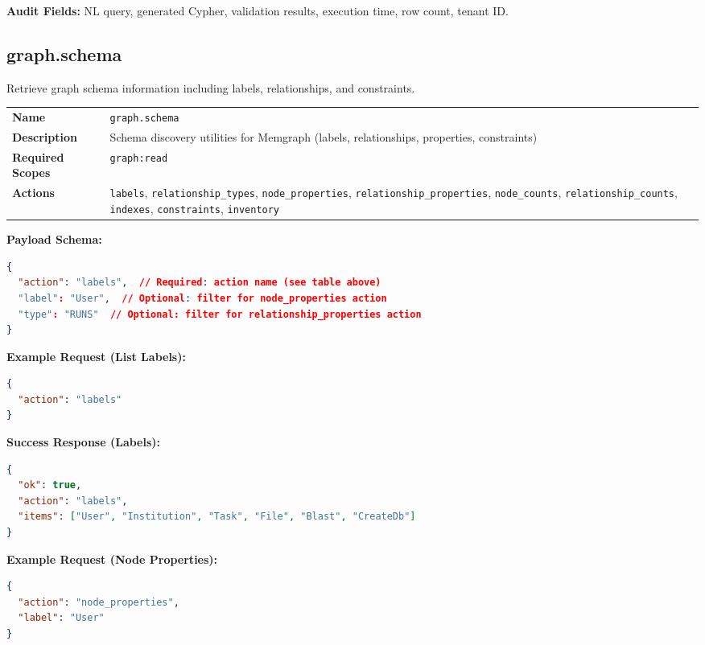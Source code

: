 \textbf{Audit Fields:} NL query, generated Cypher, validation results, execution time, row count, tenant ID.

\subsection{graph.schema}

Retrieve graph schema information including labels, relationships, and constraints.

\begin{table}[ht]
\centering
\small
\begin{tabularx}{\textwidth}{lX}
    \hline
    \textbf{Name} & \texttt{graph.schema} \\
    \textbf{Description} & Schema discovery utilities for Memgraph (labels, relationships, properties, constraints) \\
    \textbf{Required Scopes} & \texttt{graph:read} \\
    \textbf{Actions} & \texttt{labels}, \texttt{relationship\_types}, \texttt{node\_properties}, \texttt{relationship\_properties}, \texttt{node\_counts}, \texttt{relationship\_counts}, \texttt{indexes}, \texttt{constraints}, \texttt{inventory} \\
    \hline
\end{tabularx}
\end{table}

\textbf{Payload Schema:}
\begin{lstlisting}[language=json]
{
  "action": "labels",  // Required: action name (see table above)
  "label": "User",  // Optional: filter for node_properties action
  "type": "RUNS"  // Optional: filter for relationship_properties action
}
\end{lstlisting}

\textbf{Example Request (List Labels):}
\begin{lstlisting}[language=json]
{
  "action": "labels"
}
\end{lstlisting}

\textbf{Success Response (Labels):}
\begin{lstlisting}[language=json]
{
  "ok": true,
  "action": "labels",
  "items": ["User", "Institution", "Task", "File", "Blast", "CreateDb"]
}
\end{lstlisting}

\textbf{Example Request (Node Properties):}
\begin{lstlisting}[language=json]
{
  "action": "node_properties",
  "label": "User"
}
\end{lstlisting}

